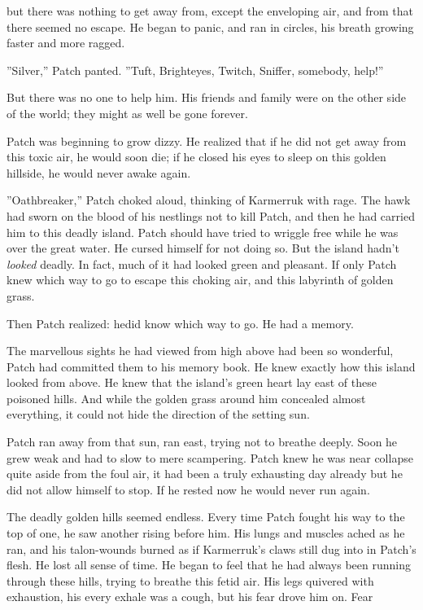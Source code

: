 \documentclass[11pt]{article}
\begin{document}
 but there was nothing to get away from, except the enveloping air, and from that there seemed no escape. He began to panic, and ran in circles, his breath growing faster and more ragged. \par
 ''Silver,'' Patch panted. ''Tuft, Brighteyes, Twitch, Sniffer, somebody, help!''\par
 But there was no one to help him. His friends and family were on the other side of the world; they might as well be gone forever.\par
 Patch was beginning to grow dizzy. He realized that if he did not get away from this toxic air, he would soon die; if he closed his eyes to sleep on this golden hillside, he would never awake again.\par
 ''Oathbreaker,'' Patch choked aloud, thinking of Karmerruk with rage. The hawk had sworn on the blood of his nestlings not to kill Patch, and then he had carried him to this deadly island. Patch should have tried to wriggle free while he was over the great water. He cursed himself for not doing so. But the island hadn't {\it looked} deadly. In fact, much of it had looked green and pleasant. If only Patch knew which way to go to escape this choking air, and this labyrinth of golden grass.\par
 Then Patch realized: he{\it  }did know which way to go. He had a memory.\par
The marvellous sights he had viewed from high above had been so wonderful, Patch had committed them to his memory book. He knew exactly how this island looked from above. He knew that the island's green heart lay east of these poisoned hills. And while the golden grass around him concealed almost everything, it could not hide the direction of the setting sun.\par
Patch ran away from that sun, ran east, trying not to breathe deeply. Soon he grew weak and had to slow to mere scampering. Patch knew he was near collapse %
 quite aside from the foul air, it had been a truly exhausting day already %
 but he did not allow himself to stop. If he rested now he would never run again.\par
The deadly golden hills seemed endless. Every time Patch fought his way to the top of one, he saw another rising before him. His lungs and muscles ached as he ran, and his talon-wounds burned as if Karmerruk's claws still dug into in Patch's flesh. He lost all sense of time. He began to feel that he had always been running through these hills, trying to breathe this fetid air. His legs quivered with exhaustion, his every exhale was a cough, but his fear drove him on. Fear %
\end{document}
